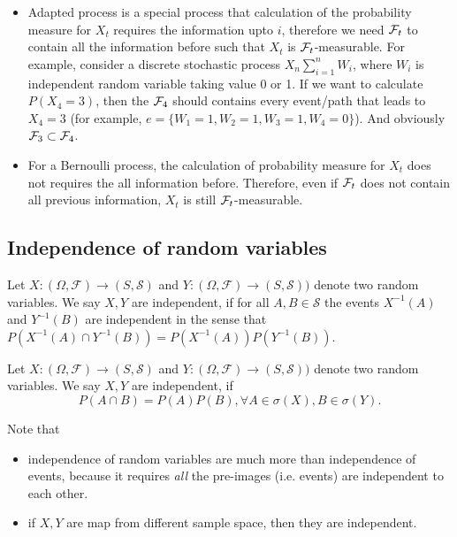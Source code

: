 \begin{refsection}
\begin{remark}\hfill
	\begin{itemize}
		\item Adapted process is a special process that calculation of the probability measure for $X_t$ requires the information upto $i$, therefore we need $\mathcal{F}_t$ to contain all the information before such that $X_t$ is $\mathcal{F}_t$-measurable. For example, consider a discrete stochastic process $X_n\sum_{i=1}^n W_i$, where $W_i$ is independent random variable taking value 0 or 1. If we want to calculate $P(X_4 = 3)$, then the $\mathcal{F}_4$ should contains every event/path that leads to $X_4=3$ (for example, $e=\{W_1=1,W_2=1,W_3=1,W_4=0\}$). And obviously $\mathcal{F}_3 \subset \mathcal{F}_4$.
		\item For a Bernoulli process, the calculation of probability measure for $X_t$ does not requires the all information before. Therefore, even if $\mathcal{F}_t$ does not contain all previous information, $X_t$ is still $\mathcal{F}_t$-measurable.
	\end{itemize}
\end{remark} 


\subsection{Independence of random variables}
\begin{definition}
Let $X:(\Omega, \mathcal{F})\rightarrow (S,\mathcal{S})$ and $Y:(\Omega, \mathcal{F})\rightarrow (S,\mathcal{S}))$ denote two random variables. We say $X,Y$ are independent, if for all $A,B \in \mathcal{S}$ the events $X^{-1}(A)$ and $Y^{-1}(B)$ are independent in the sense that $P(X^{-1}(A) \cap Y^{-1}(B)) = P(X^{-1}(A))P(Y^{-1}(B))$.
\end{definition}

\begin{definition}\cite[54]{shreve2004stochastic2}
	Let $X:(\Omega, \mathcal{F})\rightarrow (S,\mathcal{S})$ and $Y:(\Omega, \mathcal{F})\rightarrow (S,\mathcal{S}))$ denote two random variables. We say $X,Y$ are independent, if 
	$$P(A\cap B) = P(A)P(B),\forall A\in \sigma(X), B\in \sigma(Y).$$
\end{definition}

\begin{remark}
Note that 
\begin{itemize}
    \item independence of random variables are much more than independence of  events, because it requires \emph{all} the pre-images (i.e. events) are independent to each other.
    \item if $X,Y$ are map from different sample space, then they are independent. 
\end{itemize} 
\end{remark}


\end{refsection}
